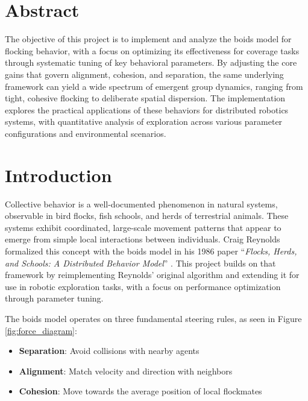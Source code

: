 \documentclass[12pt]{article}
\begin{document}
\setlength{\parindent}{0pt}
\setlength{\parskip}{0.5em}
\section*{Abstract}

The objective of this project is to implement and analyze the boids model for flocking behavior, with a focus on optimizing its effectiveness for coverage tasks through systematic tuning of key behavioral parameters. By adjusting the core gains that govern alignment, cohesion, and separation, the same underlying framework can yield a wide spectrum of emergent group dynamics, ranging from tight, cohesive flocking to deliberate spatial dispersion. The implementation explores the practical applications of these behaviors for distributed robotics systems, with quantitative analysis of exploration across various parameter configurations and environmental scenarios.

\newpage

\section{Introduction}

Collective behavior is a well-documented phenomenon in natural systems, observable in bird flocks, fish schools, and herds of terrestrial animals. These systems exhibit coordinated, large-scale movement patterns that appear to emerge from simple local interactions between individuals. Craig Reynolds formalized this concept with the boids model in his 1986 paper ``\emph{Flocks, Herds, and Schools: A Distributed Behavior Model}'' \cite{reynolds1987flocks}. This project builds on that framework by reimplementing Reynolds' original algorithm and extending it for use in robotic exploration tasks, with a focus on performance optimization through parameter tuning.

The boids model operates on three fundamental steering rules, as seen in Figure \ref{fig:force_diagram}:
\begin{itemize}[nosep]
    \item \textbf{Separation}: Avoid collisions with nearby agents
    \item \textbf{Alignment}: Match velocity and direction with neighbors
    \item \textbf{Cohesion}: Move towards the average position of local flockmates
\end{itemize}
\end{document}
